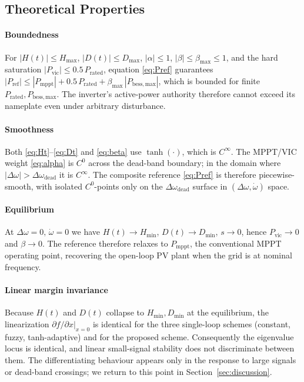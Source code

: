 \documentclass[journal]{IEEEtran}
\begin{document}
\subsection{Theoretical Properties}\label{sec:properties}
\paragraph*{Boundedness} For
$|H(t)|\leq H_\mathrm{max}$, $|D(t)|\leq D_\mathrm{max}$,
$|\alpha|\leq 1$, $|\beta|\leq \beta_\mathrm{max}\leq 1$, and the
hard saturation $|P_\mathrm{vic}|\leq 0.5\,P_\mathrm{rated}$, equation
\eqref{eq:Pref} guarantees $|P_\mathrm{ref}|\leq |P_\mathrm{mppt}|+
0.5\,P_\mathrm{rated}+\beta_\mathrm{max}\,|P_\mathrm{bess,max}|$, which
is bounded for finite $P_\mathrm{rated}, P_\mathrm{bess,max}$. The
inverter's active-power authority therefore cannot exceed its
nameplate even under arbitrary disturbance.

\paragraph*{Smoothness} Both \eqref{eq:Ht}--\eqref{eq:Dt} and
\eqref{eq:beta} use $\tanh(\cdot)$, which is $C^\infty$. The MPPT/VIC
weight \eqref{eq:alpha} is $C^0$ across the dead-band boundary; in the
domain where $|\Delta\omega|>\Delta\omega_\mathrm{dead}$ it is
$C^\infty$. The composite reference \eqref{eq:Pref} is therefore
piecewise-smooth, with isolated $C^0$-points only on the
$\Delta\omega_\mathrm{dead}$ surface in $(\Delta\omega,\dot\omega)$
space.

\paragraph*{Equilibrium} At $\Delta\omega=0,\,\dot\omega=0$ we have
$H(t)\to H_\mathrm{min}$, $D(t)\to D_\mathrm{min}$, $s\to 0$, hence
$P_\mathrm{vic}\to 0$ and $\beta\to 0$. The reference therefore
relaxes to $P_\mathrm{mppt}$, the conventional MPPT operating point,
recovering the open-loop PV plant when the grid is at nominal frequency.

\paragraph*{Linear margin invariance} Because $H(t)$ and $D(t)$
collapse to $H_\mathrm{min},D_\mathrm{min}$ at the equilibrium, the
linearization
$\partial f/\partial x\big|_{x=0}$ is identical for the three single-loop
schemes (constant, fuzzy, tanh-adaptive) and for the proposed scheme.
Consequently the eigenvalue locus is identical, and linear small-signal
stability does not discriminate between them. The differentiating
behaviour appears only in the response to large signals or dead-band
crossings; we return to this point in Section~\ref{sec:discussion}.
\end{document}
